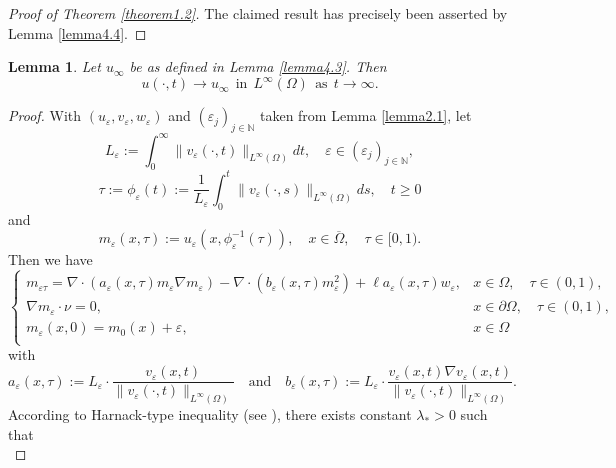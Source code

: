 \documentclass[12pt]{article}
\theoremstyle{plain}
\newtheorem{lemma}{Lemma}[section]
\theoremstyle{definition}
\numberwithin{equation}{section}
\begin{document}
\begin{proof}[Proof of Theorem \ref{theorem1.2}] The claimed result has precisely been asserted by Lemma \ref{lemma4.4}.
\end{proof}
\begin{lemma}\label{lemma4.5*}
Let $u_{\infty}$ be as defined in Lemma \ref{lemma4.3}. Then
\begin{equation}\label{4.16*}
u(\cdot,t)\to u_{\infty}~~\mbox{in}~~L^{\infty}(\Omega)~~\mbox{as}~~t\to\infty.
\end{equation}
\end{lemma}
\begin{proof}
With $(u_{\varepsilon}, v_{\varepsilon},w_\varepsilon)$ and $(\varepsilon_{j})_{j \in \mathbb{N}}$ taken from Lemma \ref{lemma2.1}, let
$$L_{\varepsilon} := \int_{0}^{\infty} \|v_{\varepsilon}(\cdot, t)\|_{L^{\infty}(\Omega)} dt, \quad \varepsilon \in (\varepsilon_{j})_{j \in \mathbb{N}},$$
$$\tau := \phi_{\varepsilon}(t) := \frac{1}{L_{\varepsilon}} \int_{0}^{t} \|v_{\varepsilon}(\cdot, s)\|_{L^{\infty}(\Omega)} ds, \quad t \geq 0$$
and
\begin{equation}\label{4.17*}
m_{\varepsilon}(x, \tau) := u_{\varepsilon}(x, \phi_{\varepsilon}^{-1}(\tau)), \quad x \in \overline{\Omega}, \quad \tau \in [0, 1).
\end{equation}
Then we have
\begin{equation}\label{4.1*}
\left\{
\begin{array}{ll}
m_{\varepsilon \tau} = \nabla \cdot (a_{\varepsilon}(x, \tau) m_{\varepsilon}\nabla m_{\varepsilon}) - \nabla \cdot (b_{\varepsilon}(x, \tau) m_{\varepsilon}^2) + \ell a_{\varepsilon}(x, \tau) w_{\varepsilon}, & x \in \Omega, \quad \tau \in (0, 1), \\
\nabla m_{\varepsilon} \cdot \nu = 0, & x \in \partial \Omega, \quad \tau \in (0, 1),\\
m_{\varepsilon}(x, 0)=m_{0}(x)+\varepsilon, & x \in \Omega\\
\end{array}
\right.
\end{equation}
with
$$a_{\varepsilon}(x, \tau) := L_{\varepsilon} \cdot \frac{v_{\varepsilon}(x, t)}{\|v_{\varepsilon}(\cdot, t)\|_{L^{\infty}(\Omega)}} \quad \text{and} \quad b_{\varepsilon}(x, \tau) := L_{\varepsilon} \cdot \frac{v_{\varepsilon}(x, t) \nabla v_{\varepsilon}(x, t)}{\|v_{\varepsilon}(\cdot, t)\|_{L^{\infty}(\Omega)}}.$$
According to Harnack-type inequality (see \cite{HarnackJDE}), %
there exists  constant $\lambda_*>0$ such that
\begin{equation}\label{4.19*}

\end{equation}
\end{proof}
\end{document}
